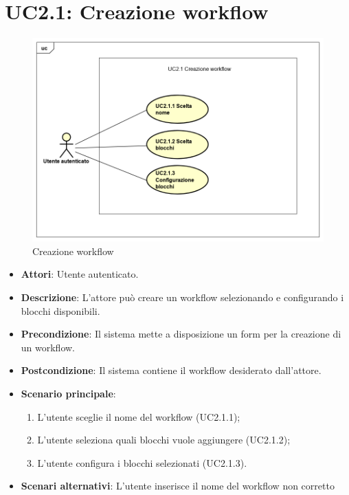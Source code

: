 \newpage
\section{UC2.1: Creazione workflow}
\label{UC2.1}

\begin{figure} [h]
	\centering
	\includegraphics[scale=0.4]{./Diagram/UC2-1.png}
	\caption{Creazione workflow}\label{}
\end{figure}

\begin{itemize}
	\item \textbf{Attori}: Utente autenticato.
	\item \textbf{Descrizione}: L'attore può creare un workflow selezionando e configurando i blocchi disponibili.
	\item \textbf{Precondizione}: Il sistema mette a disposizione un form per la creazione di un workflow.
	\item \textbf{Postcondizione}: Il sistema contiene il workflow desiderato dall'attore.
	\item \textbf{Scenario principale}:
	\begin{enumerate} \item L'utente sceglie il nome del workflow (UC2.1.1);  \item  L'utente seleziona quali blocchi vuole aggiungere (UC2.1.2);  \item 
		L'utente configura i blocchi selezionati (UC2.1.3).\end{enumerate}
	\item \textbf{Scenari alternativi}:
	L'utente inserisce il nome del workflow non corretto
\end{itemize}

